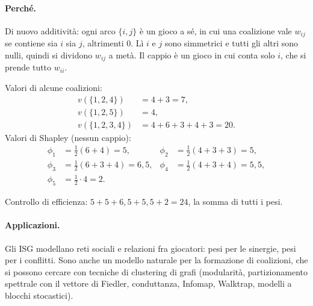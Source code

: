 \paragraph{Perché.}
Di nuovo additività: ogni arco $\{i,j\}$ è un gioco a sé, in cui una coalizione vale
$w_{ij}$ se contiene sia $i$ sia $j$, altrimenti 0. Lì $i$ e $j$ sono simmetrici e tutti
gli altri sono nulli, quindi si dividono $w_{ij}$ a metà. Il cappio è un gioco in cui conta
solo $i$, che si prende tutto $w_{ii}$.

\begin{esempio}
\par\smallskip\noindent
\begin{minipage}{0.4\linewidth}
\centering
{}
\end{minipage}%
\begin{minipage}{0.6\linewidth}
Valori di alcune coalizioni:
\[
\begin{aligned}
  v(\{1,2,4\}) &= 4 + 3 = 7,\\
  v(\{1,2,5\}) &= 4,\\
  v(\{1,2,3,4\}) &= 4 + 6 + 3 + 4 + 3 = 20.
\end{aligned}
\]
Valori di Shapley (nessun cappio):
\[
\begin{aligned}
  \phi_1 &= \tfrac12(6 + 4) = 5, &
  \phi_2 &= \tfrac12(4 + 3 + 3) = 5,\\
  \phi_3 &= \tfrac12(6 + 3 + 4) = 6{,}5, &
  \phi_4 &= \tfrac12(4 + 3 + 4) = 5{,}5,\\
  \phi_5 &= \tfrac12 \cdot 4 = 2.
\end{aligned}
\]
\end{minipage}
\par\smallskip
Controllo di efficienza: $5 + 5 + 6{,}5 + 5{,}5 + 2 = 24$, la somma di tutti i pesi.
\end{esempio}

\paragraph{Applicazioni.}
Gli ISG modellano reti sociali e relazioni fra giocatori: pesi  per le
sinergie, pesi  per i conflitti. Sono anche un modello naturale per la
formazione di coalizioni, che si possono cercare con tecniche di clustering di grafi
(modularità, partizionamento spettrale con il vettore di Fiedler, conduttanza, Infomap,
Walktrap, modelli a blocchi stocastici).

